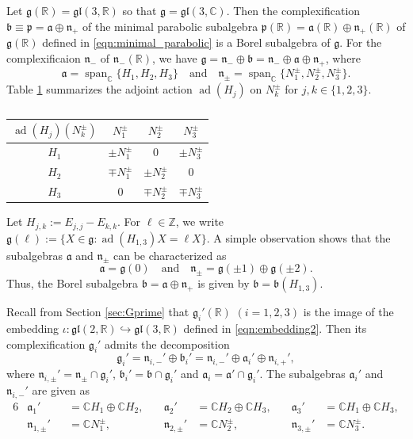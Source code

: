 \documentclass[a4paper,11pt,reqno]{amsart}
\newcommand{\fraka}{\mathfrak{a}}
\newcommand{\frakg}{\mathfrak{g}}
\newcommand{\frakn}{\mathfrak{n}}
\newcommand{\frakp}{\mathfrak{p}}
\newcommand{\CC}{\mathbb{C}}
\newcommand{\RR}{\mathbb{R}}
\newcommand{\ZZ}{\mathbb{Z}}
\newcommand{\0}{{\bf 0}}
\newcommand{\C}{\mathbb{C}}
\newcommand{\1}{{\bf 1}}
\DeclareMathOperator{\ad}{ad}
\DeclareMathOperator{\Span}{span}
\newcommand{\frakb}{{\mathfrak b}}
\theoremstyle{plain}
\theoremstyle{definition}
\numberwithin{equation}{section}
\theoremstyle{definition}
\begin{document}
Let $\frakg(\RR)=\mathfrak{gl}(3,\RR)$ so that 
$\frakg= \mathfrak{gl}(3,\CC)$.
Then the complexification $\frakb\equiv \frakp = \fraka \oplus \frakn_+$  
of the minimal parabolic subalgebra 
$\frakp(\RR)=\fraka(\RR)\oplus \frakn_+(\RR)$ of $\frakg(\RR)$ defined in 
\eqref{eqn:minimal_parabolic} is a Borel subalgebra of $\frakg$. 
For the complexificaion $\frakn_-$ of $\frakn_-(\RR)$, 
we have 
$\frakg = \frakn_- \oplus \frakb =\frakn_-\oplus \fraka \oplus \frakn_+$,
where 
\begin{equation*}
\fraka=\Span_\C\{H_1, H_2, H_3\}
\quad
\text{and}
\quad
\frakn_{\pm}=\Span_\C\{N_1^{\pm},N_2^{\pm},N_3^{\pm}\}.
\end{equation*}
Table \ref{table:adH}  summarizes
the adjoint action $\ad(H_j)$ on $N_k^\pm$ for $j, k \in \{1,2,3\}$.
\begin{table}[ht]
\caption{}
\begin{center}
\renewcommand{\arraystretch}{1.3}
{
\begin{tabular}{c|c|c|c}
\hline
$\ad(H_j)(N_k^\pm)$ & $N_1^\pm$ & $N_2^\pm$ & $N_3^\pm$\\
\hline
$H_1$ & $\pm N_1^\pm$ & $0$ & $\pm N_3^\pm$\\
\hline
$H_2$ & $\mp N_1^\pm $ & $\pm N_2^\pm$ & $0$\\
\hline
$H_3$ & $0$ & $\mp N_2^\pm$ & $\mp N_3^\pm$\\
\hline
\end{tabular}
}
\end{center}\label{table:adH}
\end{table}

Let $H_{j,k}:=E_{j,j}-E_{k,k}$.
For $\ell \in \ZZ$, we write $\frakg(\ell):=\{X \in \frakg: \ad(H_{1,3})X = \ell X\}$.
A simple observation shows that the subalgebras $\fraka$ and $\frakn_{\pm}$
can be characterized as 
\begin{equation*}
\fraka =\frakg(0)
\quad
\text{and}
\quad
\frakn_{\pm} = \frakg(\pm 1) \oplus \frakg(\pm 2).
\end{equation*}
Thus,
the Borel subalgebra $\frakb = \fraka \oplus \frakn_+$ is given by $\frakb = \frakb(H_{1,3})$.

Recall from Section \ref{sec:Gprime} that $\frakg_i'(\RR)$ $(i=1,2,3)$ is 
the image of the embedding 
$\iota\colon \mathfrak{gl}(2,\RR) \hookrightarrow \mathfrak{gl}(3,\RR)$
defined in \eqref{eqn:embedding2}. Then its complexification 
$\frakg_i'$ admits the decomposition
\begin{equation*}
\frakg_i' = \frakn_{i,-}' \oplus \frakb_i' =\frakn_{i,-}' \oplus \fraka_i' \oplus \frakn_{i,+}',
\end{equation*}
where $\frakn_{i,\pm}' = \frakn_{\pm} \cap \frakg_i'$,
$\frakb_i' =\frakb \cap \frakg_i'$ and $\fraka_i=\fraka'\cap \frakg_i'$.
The subalgebras $\fraka_i'$ and $\frakn_{i,-}'$ are given as
\begin{alignat}{6}
&\fraka_1' &&= \C H_1 \oplus \C H_2,
\quad
&\fraka_2' &= \C H_2 \oplus \C H_3,
\quad
&\fraka_3' &= \C H_1 \oplus \C H_3,\nonumber\\[3pt]
&\frakn_{1,\pm}' &&= \C N_1^{\pm},
\quad
&\frakn_{2,\pm}' &= \C N_2^{\pm},
\quad
&\frakn_{3,\pm}' &= \C N_3^{\pm}.\label{eqn:nilpotent}
\end{alignat}
\end{document}
